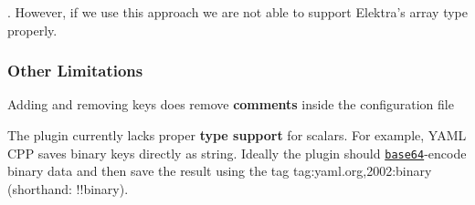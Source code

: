 . However, if we use this approach we are not able to support Elektra’s array type properly.

\subsubsection*{Other Limitations}


\begin{DoxyItemize}
\item Adding and removing keys does remove {\bfseries comments} inside the configuration file
\item The plugin currently lacks proper {\bfseries type support} for scalars. For example, Y\+A\+ML C\+PP saves binary keys directly as string. Ideally the plugin should \href{https://en.wikipedia.org/wiki/Base64}{\tt base64}-\/encode binary data and then save the result using the tag {\ttfamily tag\+:yaml.\+org,2002\+:binary} (shorthand\+: {\ttfamily !!binary}). 
\end{DoxyItemize}